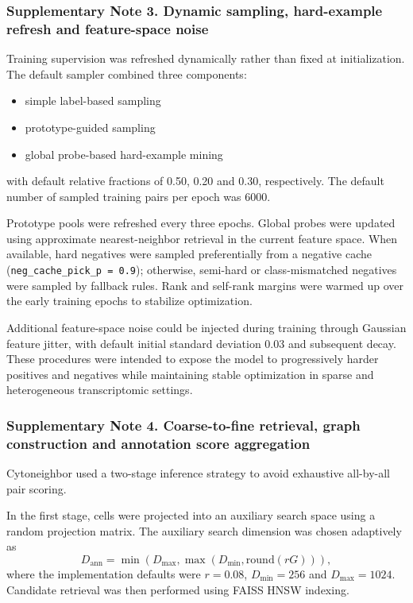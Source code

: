 \documentclass[11pt]{article}
\begin{document}
\subsubsection*{Supplementary Note 3. Dynamic sampling, hard-example refresh and feature-space noise}

Training supervision was refreshed dynamically rather than fixed at initialization. The default sampler combined three components:
\begin{itemize}
    \item simple label-based sampling
    \item prototype-guided sampling
    \item global probe-based hard-example mining
\end{itemize}
with default relative fractions of 0.50, 0.20 and 0.30, respectively. The default number of sampled training pairs per epoch was 6000.

Prototype pools were refreshed every three epochs. Global probes were updated using approximate nearest-neighbor retrieval in the current feature space. When available, hard negatives were sampled preferentially from a negative cache (\texttt{neg\_cache\_pick\_p = 0.9}); otherwise, semi-hard or class-mismatched negatives were sampled by fallback rules. Rank and self-rank margins were warmed up over the early training epochs to stabilize optimization.

Additional feature-space noise could be injected during training through Gaussian feature jitter, with default initial standard deviation 0.03 and subsequent decay. These procedures were intended to expose the model to progressively harder positives and negatives while maintaining stable optimization in sparse and heterogeneous transcriptomic settings.

\subsubsection*{Supplementary Note 4. Coarse-to-fine retrieval, graph construction and annotation score aggregation}

Cytoneighbor used a two-stage inference strategy to avoid exhaustive all-by-all pair scoring.

In the first stage, cells were projected into an auxiliary search space using a random projection matrix. The auxiliary search dimension was chosen adaptively as
\[
D_{\mathrm{ann}}=\min\!\left(D_{\max}, \max\!\left(D_{\min}, \mathrm{round}(rG)\right)\right),
\]
where the implementation defaults were $r=0.08$, $D_{\min}=256$ and $D_{\max}=1024$. Candidate retrieval was then performed using FAISS HNSW indexing.
\end{document}
